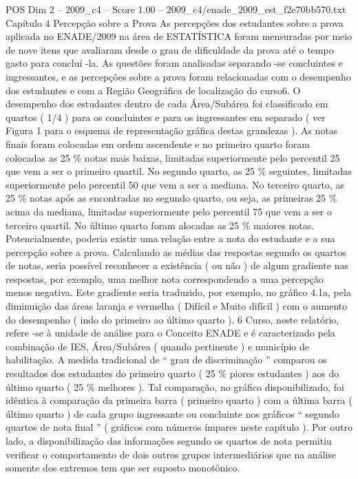 \begin{textsample}{POS Dim 2 – 2009\_c4 – Score 1.00 – 2009\_c4/enade\_2009\_est\_f2e70bb570.txt}  \label{ex:f2_pos_202}
Capítulo 4 Percepção sobre a Prova As percepções dos estudantes sobre a prova aplicada no ENADE/2009 na área de ESTATÍSTICA foram mensuradas por meio de nove itens que avaliaram desde o grau de dificuldade da prova até o tempo gasto para concluí -la.
As questões foram analisadas separando -se concluintes e ingressantes, e as percepções sobre a prova foram relacionadas com o desempenho dos estudantes e com a Região Geográfica de localização do curso6.
O desempenho dos estudantes dentro de cada Área/Subárea foi classificado em quartos ( 1/4 ) para os concluintes e para os ingressantes em separado ( ver Figura 1 para o esquema de representação gráfica destas grandezas ).
As notas finais foram colocadas em ordem ascendente e no primeiro quarto foram colocadas as 25 \% notas mais baixas, limitadas superiormente pelo percentil 25 que vem a ser o primeiro quartil.
No segundo quarto, as 25 \% seguintes, limitadas superiormente pelo percentil 50 que vem a ser a mediana.
No terceiro quarto, as 25 \% notas após as encontradas no segundo quarto, ou seja, as primeiras 25 \% acima da mediana, limitadas superiormente pelo percentil 75 que vem a ser o terceiro quartil.
No último quarto foram alocadas as 25 \% maiores notas.
Potencialmente, poderia existir uma relação entre a nota do estudante e a sua percepção sobre a prova.
Calculando as médias das respostas segundo os quartos de notas, seria possível reconhecer a existência ( ou não ) de algum gradiente nas respostas, por exemplo, uma melhor nota correspondendo a uma percepção menos negativa.
Este gradiente seria traduzido, por exemplo, no gráfico 4.1a, pela diminuição das áreas laranja e vermelha ( Difícil e Muito difícil ) com o aumento do desempenho ( indo do primeiro ao último quarto ). 6 Curso, neste relatório, refere -se à unidade de análise para o Conceito ENADE e é caracterizado pela combinação de IES, Área/Subárea ( quando pertinente ) e município de habilitação.
A medida tradicional de “ grau de discriminação ” comparou os resultados dos estudantes do primeiro quarto ( 25 \% piores estudantes ) aos do último quarto ( 25 \% melhores ).
Tal comparação, no gráfico disponibilizado, foi idêntica à comparação da primeira barra ( primeiro quarto ) com a última barra ( último quarto ) de cada grupo ingressante ou concluinte nos gráficos “ segundo quartos de nota final ” ( gráficos com números ímpares neste capítulo ).
Por outro lado, a disponibilização das informações segundo os quartos de nota permitiu verificar o comportamento de dois outros grupos intermediários que na análise somente dos extremos tem que ser suposto monotônico.

\end{textsample}
